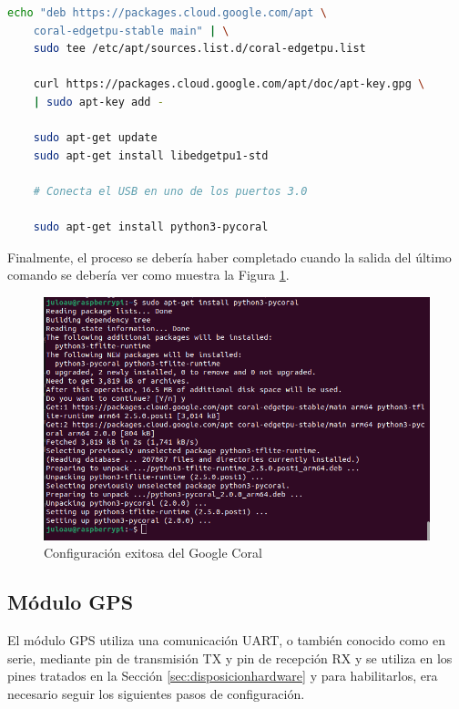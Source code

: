 \begin{lstlisting}[language=bash]
	echo "deb https://packages.cloud.google.com/apt \
	coral-edgetpu-stable main" | \
	sudo tee /etc/apt/sources.list.d/coral-edgetpu.list
	
	curl https://packages.cloud.google.com/apt/doc/apt-key.gpg \
	| sudo apt-key add -
	
	sudo apt-get update	
	sudo apt-get install libedgetpu1-std
	
	# Conecta el USB en uno de los puertos 3.0
	
	sudo apt-get install python3-pycoral
\end{lstlisting}

Finalmente, el proceso se debería haber completado cuando la salida del último comando se debería ver como muestra la Figura \ref{fig:outcoral}.

 \begin{figure} [h!]
	\begin{center}
		\includegraphics[width=12cm]{figs/cap6/pycoralinstalled.png}
	\end{center}
	\caption{Configuración exitosa del Google Coral}
	\label{fig:outcoral}
\end{figure}


\subsection{Módulo GPS}
\label{subsec:configgps}

El módulo \acs{GPS} utiliza una comunicación \acs{UART}, o también conocido como en serie, mediante pin de transmisión TX y pin de recepción RX y se utiliza en los pines tratados en la Sección \ref{sec:disposicionhardware} y para habilitarlos, era necesario seguir los siguientes pasos de configuración.

